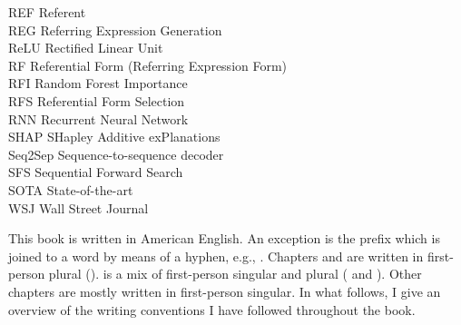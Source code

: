 \begin{tabbing}
	REF \> Referent \\
	REG \> Referring Expression Generation \\
	ReLU \> Rectified Linear Unit \\
	RF \> Referential Form (Referring Expression Form) \\
	RFI \> Random Forest Importance \\
	RFS \> Referential Form Selection \\
	RNN \> Recurrent Neural Network \\
	SHAP \> SHapley Additive exPlanations \\
	Seq2Sep \> Sequence-to-sequence decoder \\
	SFS \> Sequential Forward Search \\
	SOTA \> State-of-the-art \\
	WSJ \> Wall Street Journal
\end{tabbing}


\noindent This book is written in American English. An exception is the prefix  which is joined to a word by means of a hyphen, e.g., . \noindent Chapters \5 and \7 are written in first-person plural ().  is a mix of first-person singular and plural ( and ). Other chapters are mostly written in first-person singular. In what follows, I give an overview of the writing conventions I have followed throughout the book.

